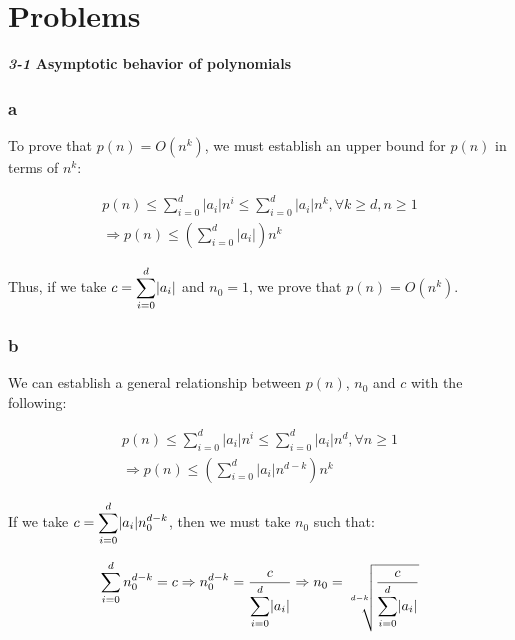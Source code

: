 \documentclass[8pt,a4paper]{article}
\begin{document}
\section*{Problems}

\begin{framed}
\textbf{\textit{3-1} Asymptotic behavior of polynomials}
\end{framed}

\subsubsection*{a}

  To prove that $p(n) = O(n^{k})$, we must establish an upper bound for $p(n)$
in terms of $n^{k}$:

\begin{equation*}
 \begin{split}
    p(n) \leq \sum_{i = 0}^{d} |a_{i}|n^{i} \leq \sum_{i = 0}^{d} |a_{i}|n^{k}, \forall k \geq d, n \geq 1 \\
    \Rightarrow p(n) \leq \left(\sum_{i = 0}^{d} |a_{ i}|\right) n^{k}
  \end{split}
\end{equation*}

  Thus, if we take $c = \mathlarger{\sum}_{i = 0}^{d} |a_{i}|$ and $n_{0} = 1$, we prove that $p(n) = O(n^{k})$.

\subsubsection*{b}

  We can establish a general relationship between $p(n)$, $n_{0}$ and $c$ with the following:

\begin{equation*}
  \begin{split}
    p(n) \leq \sum_{i = 0}^{d} |a_{i}|n^{i} \leq \sum_{i = 0}^{d} |a_{i}|n^{d}, \forall n \geq 1 \\
    \Rightarrow p(n) \leq \left(\sum_{i = 0}^{d} |a_{i}| n^{d - k}\right) n^{k}
  \end{split}
\end{equation*}

  If we take $c = \mathlarger{\sum}_{i = 0}^{d} |a_{i}| n_{0}^{d - k}$, then we must take $n_{0}$ such that:

\begin{equation*}
  \sum_{i = 0}^{d} n_{0}^{d - k} = c \Rightarrow n_{0}^{d - k} = \frac{c}{\mathlarger{\sum}_{i = 0}^{d} |a_{i}|}
    \Rightarrow n_{0} = \sqrt[d - k]{\frac{c}{\mathlarger{\sum}_{i = 0}^{d} |a_{i}|}}
\end{equation*}
\end{document}
